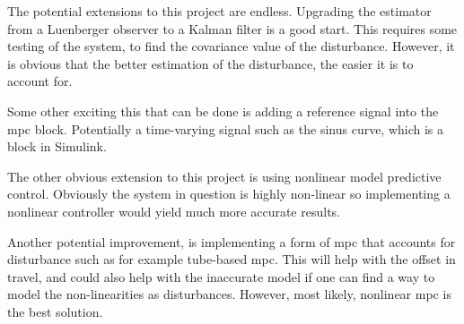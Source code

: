 The potential extensions to this project are endless. Upgrading the estimator from a Luenberger observer to a Kalman filter is a good start. This requires some testing of the system, to find the covariance value of the disturbance. However, it is obvious that the better estimation of the disturbance, the easier it is to account for.

Some other exciting this that can be done is adding a reference signal into the \acrshort{mpc} block. Potentially a time-varying signal such as the sinus curve, which is a block in Simulink. 

The other obvious extension to this project is using nonlinear model predictive control. Obviously the system in question is highly non-linear so implementing a nonlinear controller would yield much more accurate results. 

Another potential improvement, is implementing a form of \acrshort{mpc} that accounts for disturbance such as for example tube-based \acrshort{mpc}. This will help with the offset in travel, and could also help with the inaccurate model if one can find a way to model the non-linearities as disturbances. However, most likely, nonlinear \acrshort{mpc} is the best solution.


